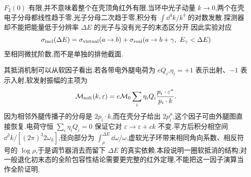 
$F_2(0)$ 有限,并不意味着整个在壳顶角红外有限.当环中光子动量 $k\to0$,两个在壳电子分母都线性趋于零,光子分母二次趋于零,积分有 $\int\dd^4k/k^4$ 的对数发散.探测器却不能把能量低于分辨率 $\Delta E$ 的光子与没有光子的末态区分开.因此实验对应
\begin{equation}
 \sigma_{\rm incl}(\Delta E)
  =\sigma_{\rm virtual}(a\to b)
   +\sigma_{\rm real}(a\to b+\gamma,\ E_\gamma<\Delta E)
\end{equation}
至相同微扰阶数,而不是单独的排他截面.

其抵消机制可以从软因子看出.若各带电外腿电荷为 $eQ_i$,$\eta_i=+1$ 表示出射、$-1$ 表示入射,软发射振幅的主项为
\begin{equation}
 \mathcal M_{\rm soft}(k,\varepsilon)
   =e\mathcal M_0\sum_i\eta_iQ_i
          \frac{p_i\cdot\varepsilon^*}{p_i\cdot k}.
 \label{eq:qed-soft-factor}
\end{equation}
因为相邻外腿传播子的分母是 $2p_i\cdot k$,而在壳分子给出 $2p_i^\mu$,这个因子可由外腿图直接恢复.电荷守恒 $\sum_i\eta_iQ_i=0$ 保证它对 $\varepsilon\to\varepsilon+ck$ 不变.平方后积分相空间 $\dd^3k/[(2\pi)^3 2\omega_k]$,径向部分为 $\int_\rho^{\Delta E}\dd\omega/\omega$.虚软光子环带来相同角向系数、相反符号的 $\log\rho$,于是调节器消去而留下 $\Delta E$ 的真实依赖.本段说明一圈软抵消的结构;对一般退化初末态的全阶包容性结论需要更完整的红外定理,不能把这一因子演算当作全阶证明.


